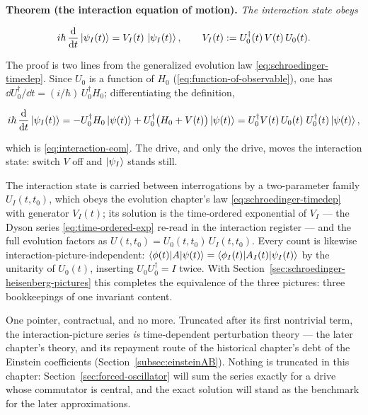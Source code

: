 \medskip\noindent\textbf{Theorem (the interaction equation of motion).} \emph{The interaction state obeys}
\begin{linenomath}
    \begin{equation}
        i\hbar\,\frac{\mathrm{d}}{\mathrm{d} t}\ket{\psi_I(t)} = V_I(t)\,\ket{\psi_I(t)}, \qquad V_I(t) := U_0^\dagger(t)\,V(t)\,U_0(t) .
        \label{eq:interaction-eom}
    \end{equation}
\end{linenomath}
The proof is two lines from the generalized evolution law \eqref{eq:schroedinger-timedep}. Since $U_0$ is a function of $H_0$ (\eqref{eq:function-of-observable}), one has $\dd U_0^\dagger/\dd t = (i/\hbar)\,U_0^\dagger H_0$; differentiating the definition,
\begin{linenomath}
    \begin{equation*}
        i\hbar\,\frac{\mathrm{d}}{\mathrm{d} t}\ket{\psi_I(t)} = -U_0^\dagger H_0\ket{\psi(t)} + U_0^\dagger\bigl(H_0 + V(t)\bigr)\ket{\psi(t)} = U_0^\dagger V(t)\,U_0(t)\;U_0^\dagger(t)\ket{\psi(t)},
    \end{equation*}
\end{linenomath}
which is \eqref{eq:interaction-eom}. The drive, and only the drive, moves the interaction state: switch $V$ off and $\ket{\psi_I}$ stands still.

The interaction state is carried between interrogations by a two-parameter family $U_I(t, t_0)$, which obeys the evolution chapter's law \eqref{eq:schroedinger-timedep} with generator $V_I(t)$; its solution is the time-ordered exponential of $V_I$ --- the Dyson series \eqref{eq:time-ordered-exp} re-read in the interaction register --- and the full evolution factors as $U(t, t_0) = U_0(t, t_0)\,U_I(t, t_0)$. Every count is likewise interaction-picture-independent: $\braket{\phi(t)|A|\psi(t)} = \braket{\phi_I(t)|A_I(t)|\psi_I(t)}$ by the unitarity of $U_0(t)$, inserting $U_0U_0^\dagger = I$ twice. With Section~\ref{sec:schroedinger-heisenberg-pictures} this completes the equivalence of the three pictures: three bookkeepings of one invariant content.

One pointer, contractual, and no more. Truncated after its first nontrivial term, the interaction-picture series \emph{is} time-dependent perturbation theory --- the later chapter's theory, and its repayment route of the historical chapter's debt of the Einstein coefficients (Section~\ref{subsec:einsteinAB}). Nothing is truncated in this chapter: Section~\ref{sec:forced-oscillator} will sum the series exactly for a drive whose commutator is central, and the exact solution will stand as the benchmark for the later approximations.

